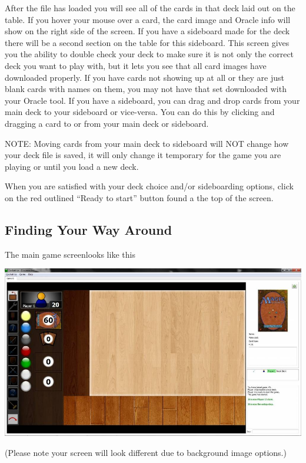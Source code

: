 \documentclass[a4paper]{scrbook}
\begin{document}
After the file has loaded you will see all of the cards in that deck laid out on the table. If you hover your mouse over a card, the card image and Oracle info will show on the right side of the screen. If you have a sideboard made for the deck there will be a second section on the table for this sideboard. This screen gives you the ability to double check your deck to make sure it is not only the correct deck you want to play with, but it lets you see that all card images have downloaded properly. If you have cards not showing up at all or they are just blank cards with names on them, you may not have that set downloaded with your Oracle tool. If you have a sideboard, you can drag and drop cards from your main deck to your sideboard or vice-versa. You can do this by clicking and dragging a card to or from your main deck or sideboard.

NOTE: Moving cards from your main deck to sideboard will NOT change how your deck file is saved, it will only change it temporary for the game you are playing or until you load a new deck.

When you are satisfied with your deck choice and/or sideboarding options, click on the red outlined “Ready to start” button found a the top of the screen.

\subsection{Finding Your Way Around}
The main game screenlooks like this
\begin{center}
\includegraphics[scale=0.4]{pics/fetch7cf0}
\end{center}
(Please note your screen will look different due to background image options.)
\end{document}
